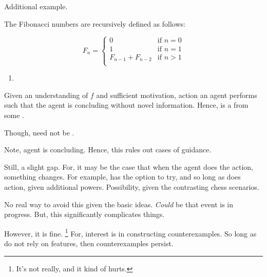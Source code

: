 \begin{note}
  Additional example.

  \begin{scenario}%
    \label{scen:fc:fib}%
    The Fibonacci numbers are recursively defined as follows:

    \[
      F_{n} = \left\{
        \begin{array}{ll}
          0 & \text{if } n = 0 \\
          1 & \text{if } n = 1 \\
          F_{n-1} + F_{n-2} & \text{if } n > 1 \\
        \end{array}
      \right.
    \]
  \end{scenario}

  \begin{enumerate}[label=C\thescenarioCounter., ref=(C\thescenarioCounter)]
  \item
    \label{scen:fc:fib:c}
  \end{enumerate}
  Given an understanding of \(f\) and sufficient motivation, action an agent performs such that the agent is concluding  without novel information.
  Hence,  is a \fc{} from some \pool{}.

  Though,  need not be .
\end{note}

\begin{note}
  Note, agent is concluding.
  Hence, this rules out cases of guidance.

  Still, a slight gap.
  For, it may be the case that when the agent does the action, something changes.
  For example, has the option to try, and so long as does action, given additional powers.
  Possibility, given the contrasting chess scenarios.

  No real way to avoid this given the basic ideas.
  \emph{Could} be that event is in progress.
  But, this significantly complicates things.

  However, it is fine.%
  \footnote{
    It's not really, and it kind of hurts.
  }
  For, interest is in constructing counterexamples.
  So long as do not rely on features, then counterexamples persist.
\end{note}

